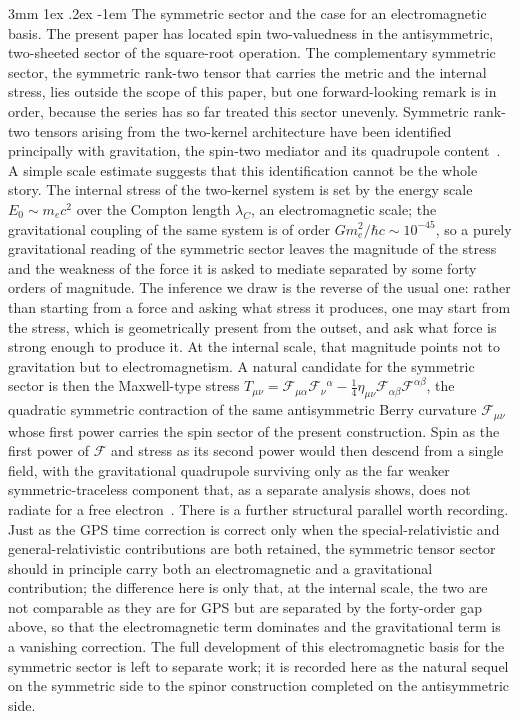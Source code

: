 \documentclass[%
 reprint, amsmath,amssymb, aps, prb, ]{revtex4-2}
\makeatletter
\numberwithin{equation}{section}
\renewcommand\paragraph{%
  \@startsection{paragraph}{4}{\z@}%
    {3mm \@plus 1ex \@minus .2ex}%
    {-1em}%
    {\normalfont\normalsize\itshape}}
\makeatother
\begin{document}
\paragraph{The symmetric sector and the case for an electromagnetic basis.}
The present paper has located spin two-valuedness in the antisymmetric, two-sheeted sector of the square-root operation. The complementary symmetric sector, the symmetric rank-two tensor that carries the metric and the internal stress, lies outside the scope of this paper, but one forward-looking remark is in order, because the series has so far treated this sector unevenly. Symmetric rank-two tensors arising from the two-kernel architecture have been identified principally with gravitation, the spin-two mediator and its quadrupole content~\cite{hanamura60}. A simple scale estimate suggests that this identification cannot be the whole story. The internal stress of the two-kernel system is set by the energy scale $E_{0}\sim m_{e}c^{2}$ over the Compton length $\lambda_{C}$, an electromagnetic scale; the gravitational coupling of the same system is of order $G m_{e}^{2}/\hbar c \sim 10^{-45}$, so a purely gravitational reading of the symmetric sector leaves the magnitude of the stress and the weakness of the force it is asked to mediate separated by some forty orders of magnitude. The inference we draw is the reverse of the usual one: rather than starting from a force and asking what stress it produces, one may start from the stress, which is geometrically present from the outset, and ask what force is strong enough to produce it. At the internal scale, that magnitude points not to gravitation but to electromagnetism. A natural candidate for the symmetric sector is then the Maxwell-type stress $T_{\mu\nu}=\mathcal{F}_{\mu\alpha}\mathcal{F}_{\nu}{}^{\alpha}-\tfrac14\eta_{\mu\nu}\mathcal{F}_{\alpha\beta}\mathcal{F}^{\alpha\beta}$, the quadratic symmetric contraction of the same antisymmetric Berry curvature $\mathcal{F}_{\mu\nu}$ whose first power carries the spin sector of the present construction. Spin as the first power of $\mathcal{F}$ and stress as its second power would then descend from a single field, with the gravitational quadrupole surviving only as the far weaker symmetric-traceless component that, as a separate analysis shows, does not radiate for a free electron~\cite{hanamura59}. There is a further structural parallel worth recording. Just as the GPS time correction is correct only when the special-relativistic and general-relativistic contributions are both retained, the symmetric tensor sector should in principle carry both an electromagnetic and a gravitational contribution; the difference here is only that, at the internal scale, the two are not comparable as they are for GPS but are separated by the forty-order gap above, so that the electromagnetic term dominates and the gravitational term is a vanishing correction. The full development of this electromagnetic basis for the symmetric sector is left to separate work; it is recorded here as the natural sequel on the symmetric side to the spinor construction completed on the antisymmetric side.
\end{document}
